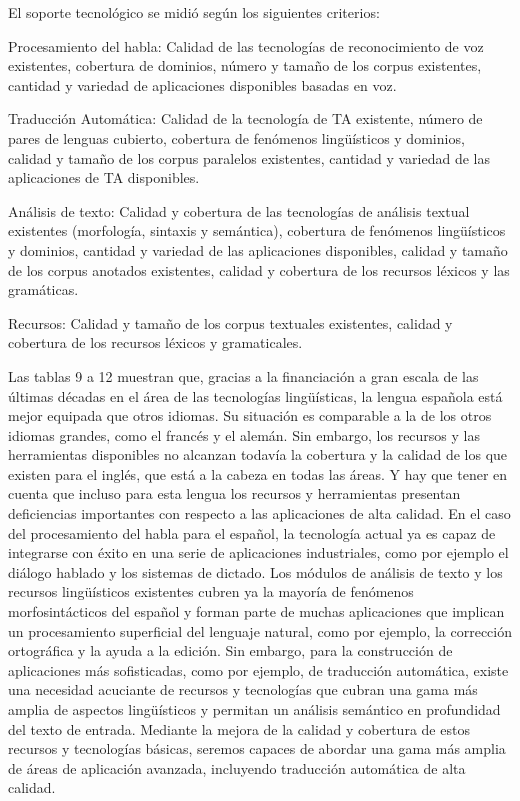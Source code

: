 \begin{multicols}{2}
El soporte tecnológico se midió según los siguientes criterios:

Procesamiento del habla: Calidad de las tecnologías de reconocimiento de voz existentes, cobertura de dominios, número y tamaño de los corpus existentes, cantidad y variedad de aplicaciones disponibles basadas en voz.

Traducción Automática: Calidad de la tecnología de TA existente, número de pares de lenguas cubierto, cobertura de fenómenos lingüísticos y dominios, calidad y tamaño de los corpus paralelos existentes, cantidad y variedad de las aplicaciones de TA disponibles.

Análisis de texto: Calidad y cobertura de las tecnologías de análisis textual existentes (morfología, sintaxis y semántica), cobertura de fenómenos lingüísticos y dominios, cantidad y variedad de las aplicaciones disponibles, calidad y tamaño de los corpus anotados existentes, calidad y cobertura de los recursos léxicos y las gramáticas.

Recursos: Calidad y tamaño de los corpus textuales existentes, calidad y cobertura de los recursos léxicos y gramaticales.

Las tablas 9 a 12 muestran que, gracias a la financiación a gran escala de las últimas décadas en el área de las tecnologías lingüísticas, la lengua española está mejor equipada que otros idiomas. Su situación es comparable a la de los otros idiomas  grandes, como el francés y el alemán. Sin embargo, los recursos y las herramientas disponibles no alcanzan todavía la cobertura y la calidad de los que existen para el inglés, que está a la cabeza en todas las áreas. Y hay que tener en cuenta que  incluso para esta lengua los recursos y herramientas presentan deficiencias importantes con respecto a las aplicaciones de alta calidad.
En el caso del procesamiento del habla para el español, la tecnología actual ya es capaz de integrarse con éxito en una serie de aplicaciones industriales, como por ejemplo el diálogo hablado y los sistemas de dictado. Los módulos de análisis de texto y los recursos lingüísticos existentes cubren ya la mayoría de fenómenos morfosintácticos del español y forman parte de muchas aplicaciones que implican un procesamiento superficial del lenguaje natural, como por ejemplo, la corrección ortográfica y la ayuda a la edición.
Sin embargo, para la construcción de aplicaciones más sofisticadas, como por ejemplo, de traducción automática, existe una necesidad acuciante de recursos y tecnologías que cubran una gama más amplia de aspectos lingüísticos y permitan un análisis semántico en profundidad del texto de entrada. Mediante la mejora de la calidad y cobertura de estos recursos y tecnologías básicas, seremos capaces de abordar una gama más amplia de áreas de aplicación avanzada, incluyendo traducción automática de alta calidad.


\end{multicols}
